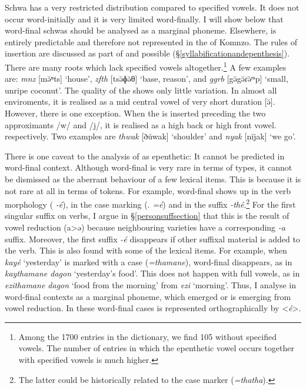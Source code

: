 Schwa has a very restricted distribution compared to specified vowels. It does not occur word-initially and it is very limited word-finally. I will show below that word-final schwas should be analysed as a marginal phoneme. Elsewhere,  is entirely predictable and therefore not represented in the  of Komnzo. The rules of  insertion are discussed as part of  and possible  ({\S}\ref{syllabificationandepenthesis}). There are many roots which lack specified vowels altogether.\footnote{Among the 1700 entries in the dictionary, we find 105 without specified vowels. The number of entries in which the epenthetic vowel occurs together with specified vowels is much higher.} A few examples are: \emph{mnz} [mə̆ⁿts] `house', \emph{zfth} [tsə̆ɸə̆θ] `base, reason', and \emph{ggrb} [{\ᵑ}gə̆{\ᵑ}gə̆ɾə̆ᵐp] `small, unripe coconut'. The quality of the  shows only little variation. In almost all enviroments, it is realised as a mid central vowel of very short duration [ə̆]. However, there is one exception. When the  is inserted preceding the two approximants /w/ and /j/, it is realised as a high back or high front vowel. respectively. Two examples are \emph{thwak} [ðŭwak] `shoulder' and \emph{nyak} [nĭjak] `we go'.

There is one caveat to the analysis of  as epenthetic: It cannot be predicted in word-final context. Although word-final  is very rare in terms of types, it cannot be dismissed as the aberrant behaviour of a few lexical items. This is because it is not rare at all in terms of tokens. For example, word-final  shows up in the verb morphology (\Fsg{} \emph{-é}), in the case marking (\Erg.{\Nsg} \emph{=é}) and in the  suffix \emph{-thé}.\footnote{The latter could be historically related to the  case marker (\emph{=thatha}).} For the first singular suffix on verbs, I argue in {\S}\ref{personsuffsection} that this is the result of vowel reduction (a>ə) because neighbouring varieties have a corresponding \emph{-a} suffix. Moreover, the first  suffix \emph{-é} disappears if other suffixal material is added to the verb. This is also found with some of the lexical items. For example, when \emph{kayé} `yesterday' is marked with a   case (\emph{=thamane}), word-final  disappears, as in \emph{kaythamane dagon} `yesterday's food'. This does not happen with full vowels, as in \emph{ezithamane dagon} `food from the morning' from \emph{ezi} `morning'. Thus, I analyse  in word-final contexts as a marginal phoneme, which emerged or is emerging from vowel reduction. In these word-final cases  is represented orthographically by <\emph{é}>.

